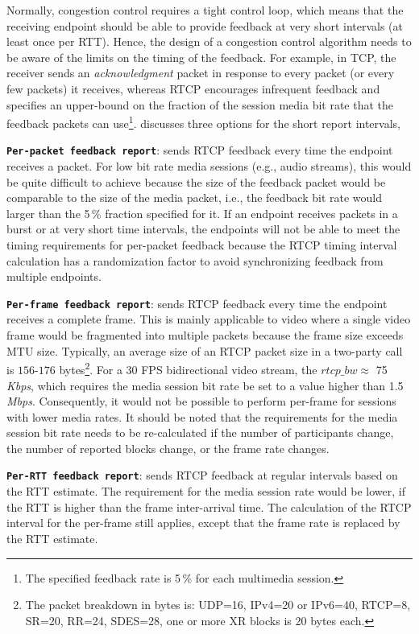 Normally, congestion control requires a tight control loop, which means that
the receiving endpoint should be able to provide feedback at very short
intervals (at least once per RTT). Hence, the design of a congestion control
algorithm needs to be aware of the limits on the timing of the feedback. For
example, in TCP, the receiver sends an \emph{acknowledgment} packet in
response to every packet (or every few packets) it receives, whereas RTCP
encourages infrequent feedback and specifies an upper-bound on the fraction of
the session media bit rate that the feedback packets can use\footnote{The
specified feedback rate is 5\,\% for each multimedia session.}.
\cite{draft.rmcat.feedback} discusses three options for the short report
intervals,

\textbf{\texttt{Per-packet feedback report}}: sends RTCP feedback every time
the endpoint receives a packet. For low bit rate media sessions (e.g., audio
streams), this would be quite difficult to achieve because the size of the
feedback packet would be comparable to the size of the media packet, i.e., the
feedback bit rate would larger than the 5\,\% fraction specified for it. If an
endpoint receives packets in a burst or at very short time intervals, the
endpoints will not be able to meet the timing requirements for per-packet
feedback because the RTCP timing interval calculation has a randomization
factor to avoid synchronizing feedback from multiple endpoints.

\textbf{\texttt{Per-frame feedback report}}: sends RTCP feedback every time
the endpoint receives a complete frame. This is mainly applicable to video
where a single video frame would be fragmented into multiple packets because
the frame size exceeds MTU size. Typically, an average size of an RTCP packet
size in a two-party call is $156$-$176$ bytes\footnote{The packet breakdown in
bytes is: UDP=16, IPv4=20 or IPv6=40, RTCP=8, SR=20, RR=24, SDES=28, one or
more XR blocks is 20 bytes each.}. For a 30 FPS bidirectional video stream, the
$rtcp\_bw \approx$ 75\,\emph{Kbps}, which requires the media session bit rate
be set to a value higher than 1.5\,\emph{Mbps}. Consequently, it would not be
possible to perform per-frame for sessions with lower media rates. It should
be noted that the requirements for the media session bit rate needs to be 
re-calculated if the number of participants change, the number of reported
blocks change, or the frame rate changes.

\textbf{\texttt{Per-RTT feedback report}}: sends RTCP feedback at regular
intervals based on the RTT estimate. The requirement for the media session
rate would be lower, if the RTT is higher than the frame inter-arrival time.
The calculation of the RTCP interval for the per-frame still applies, except
that the frame rate is replaced by the RTT estimate.

